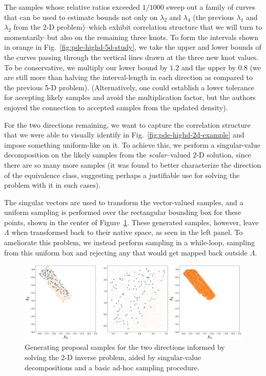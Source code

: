 The samples whose relative ratios exceeded $1/1000$ sweep out a family of curves that can be used to estimate bounds not only on $\lambda_2$ and $\lambda_4$ (the previous $\lambda_1$ and $\lambda_2$ from the 2-D problem)\---which exhibit correlation structure that we will turn to momentarily\---but also on the remaining three knots.
To form the intervals shown in orange in Fig.~\ref{fig:pde-highd-5d-study}, we take the upper and lower bounds of the curves passing through the vertical lines drawn at the three new knot values.
To be conservative, we multiply our lower bound by $1.2$ and the upper by $0.8$ (we are still more than halving the interval-length in each direction as compared to the previous 5-D problem).
(Alternatively, one could establish a lower tolerance for accepting likely samples and avoid the multiplication factor, but the authors enjoyed the connection to accepted samples from the updated density).

For the two directions remaining, we want to capture the correlation structure that we were able to visually identify in Fig.~\ref{fig:pde-highd-2d-example} and impose something uniform-like on it.
To achieve this, we perform a singular-value decomposition on the likely samples from the \emph{scalar}--valued 2-D solution, since there are so many more samples (it was found to better characterize the direction of the equivalence class, suggesting perhaps a justifiable use for solving the problem with it in such cases).

The singular vectors are used to transform the vector-valued samples, and a uniform sampling is performed over the rectangular bounding box for these points, shown in the center of Figure~\ref{fig:pde-highd-2d-study}.
These generated samples, however, leave $\Lambda$ when transformed back to their native space, as seen in the left panel.
To ameliorate this problem, we instead perform sampling in a while-loop, sampling from this uniform box and rejecting any that would get mapped back outside $\Lambda$.


\begin{figure}[htbp]
\centering
  \includegraphics[width=0.95\linewidth]{figures/pde-highd/pde-highd-alt_initial_D2_m100}
\caption{
Generating proposal samples for the two directions informed by solving the 2-D inverse problem, aided by singular-value decompositions and a basic ad-hoc sampling procedure.
}
\label{fig:pde-highd-2d-study}
\end{figure}

